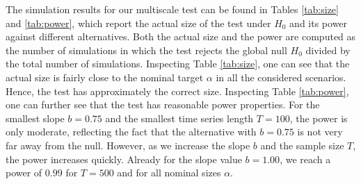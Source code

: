 \documentclass[a4paper,12pt]{article}
\begin{document}
%
%

The simulation results for our multiscale test can be found in Tables \ref{tab:size} and \ref{tab:power}, which report the actual size of the test under $H_0$ and its power against different alternatives. Both the actual size and the power are computed as the number of simulations in which the test rejects the global null $H_0$ divided by the total number of simulations.
Inspecting Table \ref{tab:size}, one can see that the actual size is fairly close to the nominal target $\alpha$ in all the considered scenarios. Hence, the test has approximately the correct size. %
Inspecting Table \ref{tab:power}, one can further see that the test has reasonable power properties. For the smallest slope $b=0.75$ and the smallest time series length $T=100$, the power is only moderate, reflecting the fact that the alternative with $b=0.75$ is not very far away from the null. However, as we increase the slope $b$ and the sample size $T$, the power increases quickly. Already for the slope value $b = 1.00$, we reach a power of $0.99$ for $T = 500$ and for all nominal sizes $\alpha$.

\end{document}
